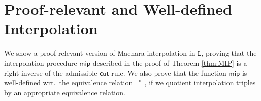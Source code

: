 \documentclass[a4paper,UKenglish,cleveref,autoref,thm-restate, anonymous]{lipics-v2021}
\newcommand{\mf}[1]{\mathsf{#1}}
\renewcommand{\L}{$\mathtt{L}$}
\newcommand{\cut}{\mf{cut}}
\begin{document}
\section{Proof-relevant and Well-defined Interpolation}
We show a proof-relevant version of Maehara interpolation in \L, proving that the interpolation procedure $\mf{mip}$ described in the proof of Theorem \ref{thm:MIP} is a right inverse of the admissible $\cut$ rule.
We also prove that the function $\mf{mip}$ is well-defined wrt.\ the equivalence relation $\circeq$, if we quotient interpolation triples by an appropriate equivalence relation.
\end{document}
